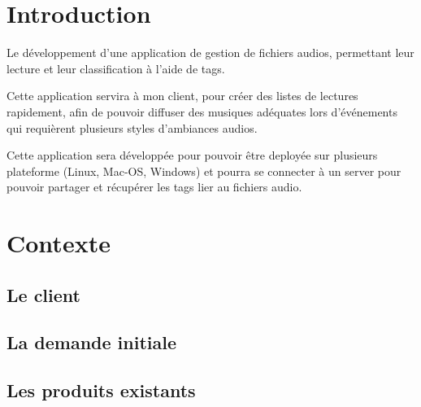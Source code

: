 \documentclass[a4paper,12pt]{report}
\author{Thomas Stassin}
\date{}
\begin{document}


\newpage
\thispagestyle{empty}
\addtocounter{page}{-1}
\null
\newpage



\tableofcontents
\pagebreak

\chapter{Introduction}

Le développement d'une application de gestion de fichiers audios, permettant leur lecture et leur classification à l'aide de tags.

Cette application servira à mon client, pour créer des listes de lectures rapidement, afin de pouvoir diffuser des musiques adéquates lors d'événements qui requièrent plusieurs styles d'ambiances audios.

Cette application sera développée pour pouvoir \^{e}tre deployée sur plusieurs plateforme (Linux, Mac-OS, Windows) et pourra se connecter à un server pour pouvoir partager et récupérer les tags lier au fichiers audio.

\chapter{Contexte}

\section{Le client}

\section{La demande initiale}

\section{Les produits existants}
\end{document}
